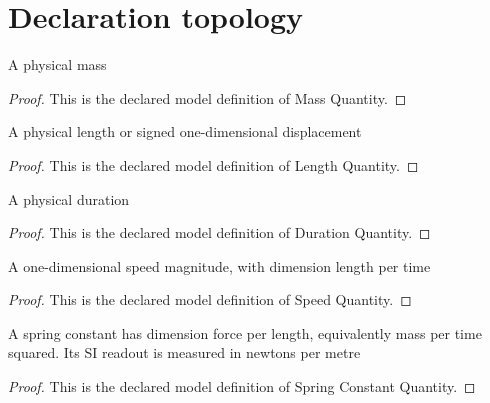\section{Declaration topology}
\begin{definition}
  \label{def:physics:phyx-mini-0236:phyxminiproblems-problemphyxmini0236-massquantity}
  A physical mass
\end{definition}
\begin{proof}
  This is the declared model definition of Mass Quantity.
\end{proof}
\begin{definition}
  \label{def:physics:phyx-mini-0236:phyxminiproblems-problemphyxmini0236-lengthquantity}
  A physical length or signed one-dimensional displacement
\end{definition}
\begin{proof}
  This is the declared model definition of Length Quantity.
\end{proof}
\begin{definition}
  \label{def:physics:phyx-mini-0236:phyxminiproblems-problemphyxmini0236-durationquantity}
  A physical duration
\end{definition}
\begin{proof}
  This is the declared model definition of Duration Quantity.
\end{proof}
\begin{definition}
  \label{def:physics:phyx-mini-0236:phyxminiproblems-problemphyxmini0236-speedquantity}
  A one-dimensional speed magnitude, with dimension length per time
\end{definition}
\begin{proof}
  This is the declared model definition of Speed Quantity.
\end{proof}
\begin{definition}
  \label{def:physics:phyx-mini-0236:phyxminiproblems-problemphyxmini0236-springconstantquantity}
  A spring constant has dimension force per length, equivalently mass per time squared. Its SI readout is measured in newtons per metre
\end{definition}
\begin{proof}
  This is the declared model definition of Spring Constant Quantity.
\end{proof}
